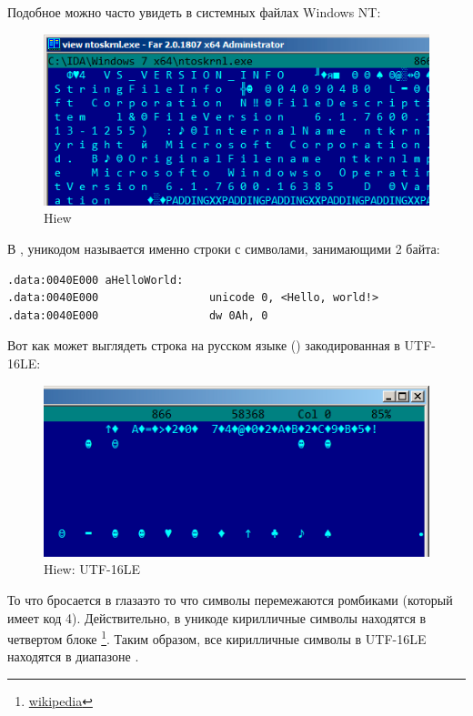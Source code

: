Подобное можно часто увидеть в системных файлах \gls{Windows NT}:

\begin{figure}[H]
\centering
\includegraphics[scale=\NormalScale]{digging_into_code/strings/ntoskrnl_UTF16.png}
\caption{Hiew}
\end{figure}

В \IDA, уникодом называется именно строки с символами, занимающими 2 байта:

\begin{lstlisting}
.data:0040E000 aHelloWorld:
.data:0040E000                 unicode 0, <Hello, world!>
.data:0040E000                 dw 0Ah, 0
\end{lstlisting}

Вот как может выглядеть строка на русском языке () закодированная в UTF-16LE:

\begin{figure}[H]
\centering
\includegraphics[scale=\NormalScale]{digging_into_code/strings/russian_UTF16.png}
\caption{Hiew: UTF-16LE}
\end{figure}

То что бросается в глаза\EMDASH{}это то что символы перемежаются ромбиками (который имеет код 4).
Действительно, в уникоде кирилличные символы находятся в четвертом блоке
\footnote{\href{http://go.yurichev.com/17003}{wikipedia}}.
Таким образом, все кирилличные символы в UTF-16LE находятся в диапазоне .

